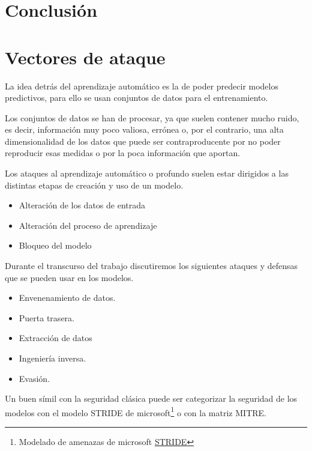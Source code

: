 \section{Conclusión}






\section{Vectores de ataque}

La idea detrás del aprendizaje automático es la de poder predecir modelos predictivos, para ello se usan conjuntos de datos para el entrenamiento.

Los conjuntos de datos se han de procesar, ya que suelen contener mucho ruido, es decir, información muy poco valiosa, errónea o, por el contrario, una alta dimensionalidad de los datos que puede ser contraproducente por no poder reproducir esas medidas o por la poca información que aportan.

Los ataques al aprendizaje automático o profundo suelen estar dirigidos a las distintas etapas de creación y uso de un modelo.

\begin{itemize}
    \item Alteración de los datos de entrada
    \item Alteración del proceso de aprendizaje
    \item Bloqueo del modelo
\end{itemize}

Durante el transcurso del trabajo discutiremos los siguientes ataques y defensas que se pueden usar en los modelos.

\begin{itemize}
    \item Envenenamiento de datos.
    \item Puerta trasera.
    \item Extracción de datos
    \item Ingeniería inversa.
    \item Evasión.
\end{itemize}

Un buen símil con la seguridad clásica puede ser categorizar la seguridad de los modelos con el modelo \gls{STRIDE} de microsoft\footnote{Modelado de amenazas de microsoft \href{https://learn.microsoft.com/es-es/azure/security/develop/threat-modeling-tool-threats}{STRIDE}} o con la matriz \gls{MITRE}.

